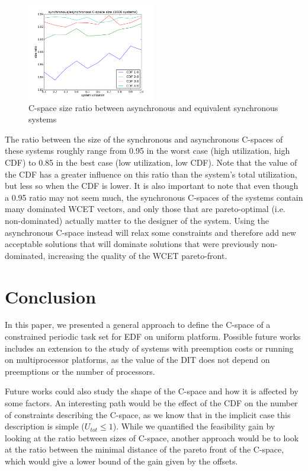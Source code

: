\documentclass[conference]{IEEEtran}
\begin{document}
	\begin{figure}[h]
		\begin{center}
			\includegraphics[width=0.5\textwidth]{figs/sizeRatio.png}
			\caption{C-space size ratio between asynchronous and equivalent synchronous
			systems}
			\label{fig:sizeRatio}
		\end{center}
	\end{figure}

	The ratio between the size of the synchronous and asynchronous C-spaces of
	these systems roughly range from 0.95 in the worst case (high utilization, high
	CDF) to 0.85 in the best case (low utilization, low CDF). Note that the value
	of the CDF has a greater influence on this ratio than the system's total
	utilization, but less so when the CDF is lower. It is also important to note
	that even though a 0.95 ratio may not seem much, the synchronous C-spaces of
	the systems contain many dominated WCET vectors, and only those that are
	pareto-optimal (i.e. non-dominated) actually matter to the designer of the system.
	Using the asynchronous C-space instead will relax some constraints and therefore add new acceptable
	solutions that will dominate solutions that were previously non-dominated,
	increasing the quality of the WCET pareto-front.


\section{Conclusion}

In this paper, we presented a general approach to define the C-space of a constrained periodic task set for EDF on uniform platform. Possible future works includes an extension to the study of systems with preemption costs or running on multiprocessor platforms, as the value of the DIT does not depend on preemptions or the number of processors.

Future works could also study the shape of the C-space and how it is affected by some factors. An interesting path would be the effect of the CDF on the number of constraints describing the C-space, as we know that in the implicit case this description is simple ($U_{tot} \leqslant 1$). While we quantified the feasibility gain by looking at the ratio between sizes of C-space, another approach would be to look at the ratio between the minimal distance of the pareto front of the C-space, which would give a lower bound of the gain given by the offsets.
\end{document}
